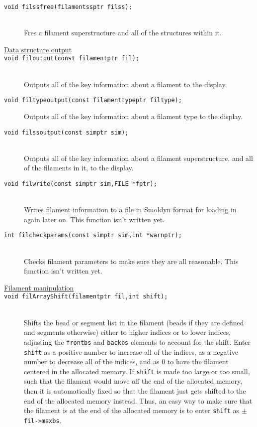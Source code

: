 \documentclass {scrbook}
\newcommand {\ttt} {\texttt}
\begin{document}
\begin{description}
\item[\ttt{void filssfree(filamentssptr filss);}]
\hfill \\
Fres a filament superstructure and all of the structures within it.


\item[\underline{Data structure output}]

\item[\ttt{void filoutput(const filamentptr fil);}]
\hfill \\
Outputs all of the key information about a filament to the display.

\item[\ttt{void filtypeoutput(const filamenttypeptr filtype);}]
Outputs all of the key information about a filament type to the display.

\item[\ttt{void filssoutput(const simptr sim);}]
\hfill \\
Outputs all of the key information about a filament superstructure, and all of the filaments in it, to the display.

\item[\ttt{void filwrite(const simptr sim,FILE *fptr);}]
\hfill \\
Writes filament information to a file in Smoldyn format for loading in again later on. This function isn't written yet.

\item[\ttt{int filcheckparams(const simptr sim,int *warnptr);}]
\hfill \\
Checks filament parameters to make sure they are all reasonable. This function isn't written yet.

\item[\underline{Filament manipulation}]

\item[\ttt{void filArrayShift(filamentptr fil,int shift);}]
\hfill \\
Shifts the bead or segment list in the filament (beads if they are defined and segments otherwise) either to higher indices or to lower indices, adjusting the \ttt{frontbs} and \ttt{backbs} elements to account for the shift. Enter \ttt{shift} as a positive number to increase all of the indices, as a negative number to decrease all of the indices, and as 0 to have the filament centered in the allocated memory. If \ttt{shift} is made too large or too small, such that the filament would move off the end of the allocated memory, then it is automatically fixed so that the filament just gets shifted to the end of the allocated memory instead. Thus, an easy way to make sure that the filament is at the end of the allocated memory is to enter \ttt{shift} as $\pm$\ttt{fil->maxbs}.


\end{description}
\end{document}
